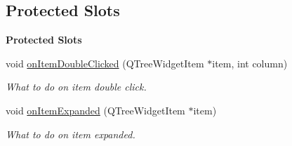 \subsection*{Protected Slots}
\begin{Indent}\textbf{ Protected Slots}\par
\begin{DoxyCompactItemize}
\item 
\mbox{\label{classrev_1_1_view_1_1_resource_tree_widget_ad378b7e63b35f38160dd7e377ec765b4}} 
void \mbox{\hyperlink{classrev_1_1_view_1_1_resource_tree_widget_ad378b7e63b35f38160dd7e377ec765b4}{on\+Item\+Double\+Clicked}} (Q\+Tree\+Widget\+Item $\ast$item, int column)
\begin{DoxyCompactList}\small\item\em What to do on item double click. \end{DoxyCompactList}\item 
\mbox{\label{classrev_1_1_view_1_1_resource_tree_widget_a5cda2e4b5d22c7cd1aad9fe29e340198}} 
void \mbox{\hyperlink{classrev_1_1_view_1_1_resource_tree_widget_a5cda2e4b5d22c7cd1aad9fe29e340198}{on\+Item\+Expanded}} (Q\+Tree\+Widget\+Item $\ast$item)
\begin{DoxyCompactList}\small\item\em What to do on item expanded. \end{DoxyCompactList}\end{DoxyCompactItemize}
\end{Indent}
